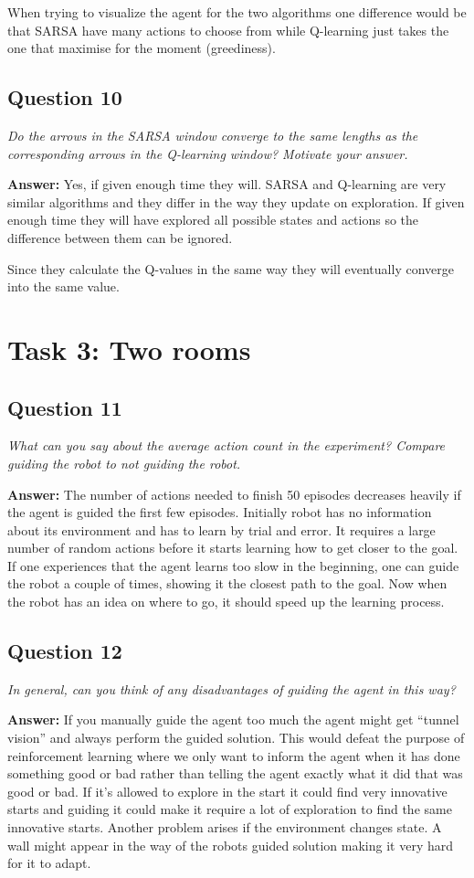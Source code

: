 \documentclass[a4paper]{article}
\begin{document}
When trying to visualize the agent for the two algorithms one difference would be that SARSA have many actions to choose from while Q-learning just takes the one that maximise for the moment (greediness).

\subsection*{Question 10}
\emph{Do the arrows in the SARSA window converge to the same
lengths as the corresponding arrows in the Q-learning window? Motivate your answer.}

\textbf{Answer:} Yes, if given enough time they will. SARSA and Q-learning are very similar algorithms and they differ in the way they update on exploration. If given enough time they will have explored all possible states and actions so the difference between them can be ignored. 

Since they calculate the Q-values in the same way they will eventually converge into the same value.

\section{Task 3: Two rooms}

\subsection*{Question 11}
\emph{What can you say about the average action count in the experiment? Compare guiding the robot to not guiding the robot.}

\textbf{Answer:} 
The number of actions needed to finish 50 episodes decreases heavily if the agent is guided the first few episodes. Initially robot has no information about its environment and has to learn by trial and error. It requires a large number of random actions before it starts learning how to get closer to the goal. If one experiences that the agent learns too slow in the beginning, one can guide the robot a couple of times, showing it the closest path to the goal. Now when the robot has an idea on where to go, it should speed up the learning process. 

\subsection*{Question 12}
\emph{In general, can you think of any disadvantages of guiding the
agent in this way?} 

\textbf{Answer:} If you manually guide the agent too much the agent might get ``tunnel vision'' and always perform the guided solution. This would defeat the purpose of reinforcement learning where we only want to inform the agent when it has done something good or bad rather than telling the agent exactly what it did that was good or bad. If it's allowed to explore in the start it could find very innovative starts and guiding it could make it require a lot of exploration to find the same innovative starts. Another problem arises if the environment changes state. A wall might appear in the way of the robots guided solution making it very hard for it to adapt. 
\end{document}
